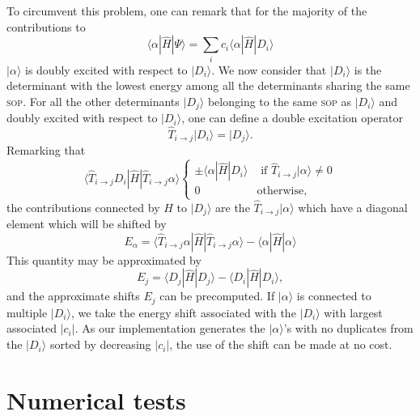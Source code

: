 \documentclass[aip,jcp,reprint,showkeys]{revtex4-1}
\newcommand{\ket}[1]{|#1\rangle}
\newcommand{\sop}{\textsc{sop}}
\newcommand{\mel}[3]{\langle #1 | #2 | #3 \rangle}
\begin{document}
To circumvent this problem, one can remark that for the majority of the
contributions to
\begin{equation}
 \mel{\alpha}{\hat{H}}{\Psi} = \sum_i c_i \mel{\alpha}{\hat{H}}{D_i}
\end{equation}
$\ket{\alpha}$ is doubly excited with respect to $\ket{D_i}$.
We now consider that $\ket{D_i}$ is the determinant with the lowest
energy among all the determinants sharing the same \sop .
For all the other determinants $\ket{D_j}$ belonging to the same \sop{}
as $\ket{D_i}$ and doubly excited with respect to $\ket{D_i}$, one can define
a double excitation operator
\begin{equation}
\hat{T}_{i\rightarrow j} \ket{D_i} = \ket{D_j}.
\end{equation}
Remarking that 
\begin{equation}
\mel{\hat{T}_{i\rightarrow j} D_i}{\hat{H}}{\hat{T}_{i\rightarrow j} \alpha} 
\begin{cases}
\pm \mel{\alpha}{\hat{H}}{D_i} & \text{ if } \hat{T}_{i\rightarrow j}\ket{\alpha} \ne 0 \\
0 & \text{otherwise},
\end{cases}
\end{equation}
the contributions connected by $\hat{H}$ to $\ket{D_j}$ are the
$\hat{T}_{i\rightarrow j} \ket{\alpha}$ which have a diagonal element which
will be shifted by 
\begin{equation}
E_\alpha = \langle \hat{T}_{i\rightarrow j} \alpha | \hat{H} | \hat{T}_{i\rightarrow j} \alpha \rangle - \langle \alpha | \hat{H} | \alpha \rangle
\end{equation}
This quantity may be approximated by
\begin{equation}
E_j = \langle D_j | \hat{H} | D_j \rangle - \langle D_i | \hat{H} | D_i \rangle,
\end{equation}
and the approximate shifts $E_j$ can be precomputed.
If $\ket{\alpha}$ is connected to multiple $\ket{D_i}$, we take the energy
shift associated with the $\ket{D_i}$ with largest associated $|c_i|$.  As our
implementation generates the $\ket{\alpha}$'s with no duplicates from the
$\ket{D_i}$ sorted by decreasing $|c_i|$, the use of the shift can be made at
no cost.





\section{Numerical tests}
\end{document}

